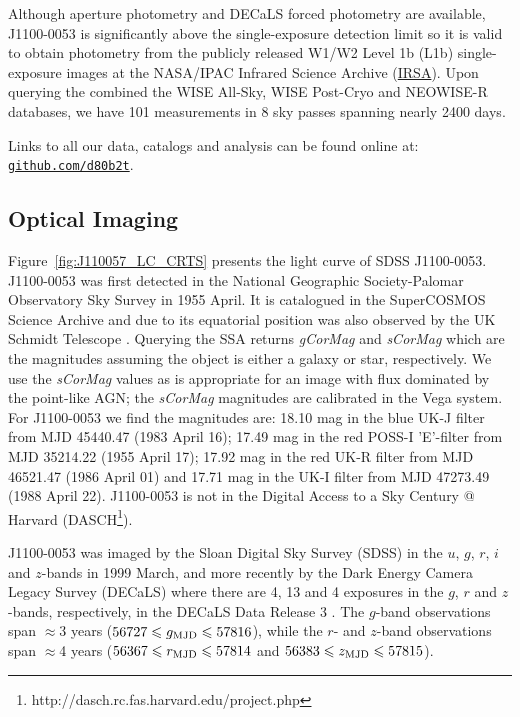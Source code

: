 \documentclass[a4paper,fleqn,usenatbib]{mnras}
\begin{document}
Although aperture photometry and DECaLS forced photometry
\citep{Lang2014, Meisner2017a, Meisner2017b} are available, J1100-0053
is significantly above the single-exposure detection limit so it is
valid to obtain photometry from the publicly released W1/W2 Level 1b
(L1b) single-exposure images at the NASA/IPAC Infrared Science Archive
(\href{http://irsa.ipac.caltech.edu/}{IRSA}).  Upon querying the
combined the WISE All-Sky, WISE Post-Cryo and NEOWISE-R databases, we
have 101 measurements in 8 sky passes spanning nearly 2400 days.

Links to all our data, catalogs and analysis can be found
online at: \href{https://github.com/d80b2t}{{\tt github.com/d80b2t}}.


\subsection{Optical Imaging}
Figure~\ref{fig:J110057_LC_CRTS} presents the light curve of SDSS
J1100-0053.  J1100-0053 was first detected in the National
Geographic Society-Palomar Observatory Sky Survey \cite[NGS-POSS;
][]{Abell1959, Minkowski_Abell1963book} in 1955 April. It is
catalogued in the SuperCOSMOS Science Archive
\citep[\href{http://ssa.roe.ac.uk/}{SSA}; ][]{Hambly2001_I,
Hambly2001_II} and due to its equatorial position was also observed by
the UK Schmidt Telescope \cite[UKST; ][]{Cannon1975,
Cannon1979book}. Querying the SSA returns {\it gCorMag} and {\it
sCorMag} which are the magnitudes assuming the object is either a
galaxy or star, respectively. We use the {\it sCorMag} values as is
appropriate for an image with flux dominated by the point-like AGN;
the {\it sCorMag} magnitudes are calibrated in the Vega system. For
J1100-0053 we find the magnitudes are: 18.10 mag in the blue UK-J
filter from MJD 45440.47 (1983 April 16); 17.49 mag in the red POSS-I
'E'-filter from MJD 35214.22 (1955 April 17); 17.92 mag in the red
UK-R filter from MJD 46521.47 (1986 April 01) and 17.71 mag in the
UK-I filter from MJD 47273.49 (1988 April 22). J1100-0053 is not in
the Digital Access to a Sky Century @ Harvard
(DASCH\footnote{http://dasch.rc.fas.harvard.edu/project.php}).

J1100-0053 was imaged by the Sloan Digital Sky Survey (SDSS) in the
$u$, $g$, $r$, $i$ and $z$-bands in 1999 March, and more recently by
the Dark Energy Camera Legacy Survey (DECaLS) where there are 4, 13
and 4 exposures in the $g$, $r$ and $z$-bands, respectively, in the
DECaLS Data Release 3 \citep[DR3; ][]{Dey2018}. The $g$-band
observations span $\approx$3 years ($56727 \leq g_{\rm MJD} \leq
57816$), while the $r$- and $z$-band observations span $\approx$4
years ($56367 \leq r_{\rm MJD} \leq 57814$ and $56383 \leq z_{\rm MJD}
\leq 57815$).
\end{document}
